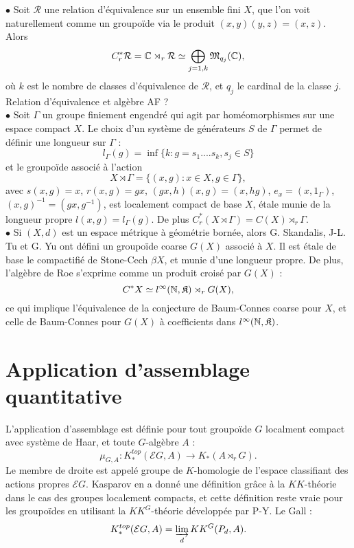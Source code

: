 $\bullet$ Soit $\mathcal R$ une relation d'équivalence sur un ensemble fini $X$, que l'on voit naturellement comme un groupoïde via le produit $(x,y)(y,z)=(x,z)$. Alors 
\[C_r^*\mathcal R= \mathbb C\rtimes_r \mathcal R \simeq \bigoplus_{j=1,k} \mathfrak M_{q_j}(\mathbb C),\] où $k$ est le nombre de classes d'équivalence de $\mathcal R$, et $q_j$ le cardinal de la classe $j$.\\
Relation d'équivalence et algèbre AF ?\\

$\bullet$ Soit $\Gamma$ un groupe finiement engendré qui agit par homéomorphismes sur une espace compact $X$. Le choix d'un système de générateurs $S$ de $\Gamma$ permet de définir une longueur sur $\Gamma$ : 
\[l_\Gamma(g)=\inf\{k : g=s_1....s_k, s_j\in S\}\]
et le groupoïde associé à l'action
\[X\rtimes \Gamma = \{(x,g) : x\in X, g\in \Gamma\},\]
 avec $s(x,g)=x$, $r(x,g)=gx$, $(gx,h)(x,g)=(x,hg)$, $e_x=(x,1_\Gamma)$, $(x,g)^{-1}=(gx,g^{-1})$, est localement compact de base $X$, étale munie de la longueur propre $l(x,g)=l_\Gamma(g)$. De plus $C^*_r (X\rtimes \Gamma)=C(X)\rtimes_r \Gamma$.\\

$\bullet$ Si $(X,d)$ est un espace métrique à géométrie bornée, alors G. Skandalis, J-L. Tu et G. Yu ont défini un groupoïde coarse $G(X)$ associé à $X$. Il est étale de base le compactifié de Stone-Cech $\beta X$, et munie d'une longueur propre. De plus, l'algèbre de Roe s'exprime comme un produit croisé par $G(X)$ :
\[C^*X\simeq l^{\infty}(\mathbb N,\mathfrak K)\rtimes_r G(X),\]
ce qui implique l'équivalence de la conjecture de Baum-Connes coarse pour $X$, et celle de Baum-Connes pour $G(X)$ à coefficients dans $l^{\infty}(\mathbb N,\mathfrak K)$.

\section{Application d'assemblage quantitative}

L'application d'assemblage est définie pour tout groupoïde $G$ localment compact avec système de Haar, et toute $G$-algèbre $A$ :
\[\mu_{G,A} : K^{top}_*(\mathcal EG,A)\rightarrow K_*(A\rtimes_r G).\]
Le membre de droite est appelé groupe de $K$-homologie de l'espace classifiant des actions propres $\mathcal E G$. Kasparov en a donné une définition grâce à la $KK$-théorie dans le cas des groupes localement compacts, et cette définition reste vraie pour les groupoïdes en utilisant la $KK^G$-théorie développée par P-Y. Le Gall :
\[K^{top}_*(\mathcal EG,A)=\varinjlim_{d} KK^G(P_d,A).\]

